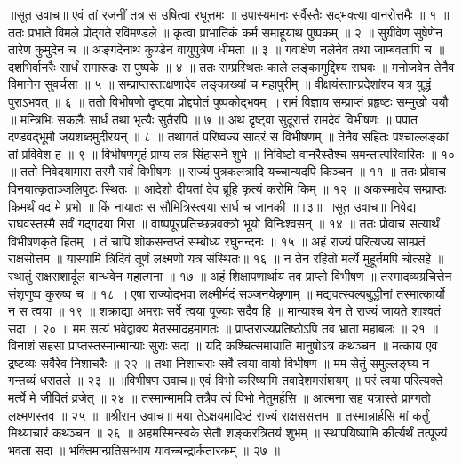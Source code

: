 ॥सूत उवाच॥
एवं तां रजनीं तत्र स उषित्वा रघूत्तमः ॥
उपास्यमानः सर्वैस्तैः सद्भक्त्या वानरोत्तमैः ॥ १ ॥
ततः प्रभाते विमले प्रोद्गते रविमण्डले ॥
कृत्वा प्राभातिकं कर्म समाहूयाथ पुष्पकम् ॥ २ ॥
सुग्रीवेण सुषेणेन तारेण कुमुदेन च ॥
अङ्गदेनाथ कुण्डेन वायुपुत्रेण धीमता ॥ ३ ॥
गवाक्षेण नलेनेव तथा जाम्बवतापि च ॥
दशभिर्वानरैः सार्धं समारूढः स पुष्पके ॥ ४ ॥
ततः सम्प्रस्थितः काले लङ्कामुद्दिश्य राघवः ॥
मनोजवेन तेनैव विमानेन सुवर्चसा ॥ ५ ॥
सम्प्राप्तस्तत्क्षणादेव लङ्काख्यां च महापुरीम् ॥
वीक्षयंस्तान्प्रदेशांश्च यत्र युद्धं पुराऽभवत् ॥ ६ ॥
ततो विभीषणो दृष्ट्वा प्रोद्द्योतं पुष्पकोद्भवम् ॥
रामं विज्ञाय सम्प्राप्तं प्रहृष्टः सम्मुखो ययौ ॥
मन्त्रिभिः सकलैः सार्धं तथा भृत्यैः सुतैरपि ॥ ७ ॥
अथ दृष्ट्वा सुदूरात्तं रामदेवं विभीषणः ॥
पपात दण्डवद्भूमौ जयशब्दमुदीरयन् ॥ ८ ॥
तथागतं परिष्वज्य सादरं स विभीषणम् ॥
तेनैव सहितः पश्चाल्लङ्कां तां प्रविवेश ह ॥ ९ ॥
विभीषणगृहं प्राप्य तत्र सिंहासने शुभे ॥
निविष्टो वानरैस्तैश्च समन्तात्परिवारितः ॥ १० ॥
ततो निवेदयामास तस्मै सर्वं विभीषणः ॥
राज्यं पुत्रकलत्रादि यच्चान्यदपि किञ्चन ॥ ११ ॥
ततः प्रोवाच विनयात्कृताञ्जलिपुटः स्थितः ॥
आदेशो दीयतां देव ब्रूहि कृत्यं करोमि किम् ॥ १२ ॥
अकस्मादेव सम्प्राप्तः किमर्थं वद मे प्रभो ॥
किं नायातः स सौमित्रिस्त्वया सार्ध च जानकी ॥।३॥
॥सूत उवाच॥
निवेद्य राघवस्तस्मै सर्वं गद्गदया गिरा ॥
वाष्पपूरप्रतिच्छन्नवक्त्रो भूयो विनिःश्वसन् ॥ १४ ॥
ततः प्रोवाच सत्यार्थं विभीषणकृते हितम् ॥
तं चापि शोकसन्तप्तं सम्बोध्य रघुनन्दनः ॥ १५ ॥
अहं राज्यं परित्यज्य साम्प्रतं राक्षसोत्तम ॥
यास्यामि त्रिदिवं तूर्णं लक्ष्मणो यत्र संस्थितः॥ १६ ॥
न तेन रहितो मर्त्ये मुहूर्तमपि चोत्सहे ॥
स्थातुं राक्षसशार्दूल बान्धवेन महात्मना ॥ १७ ॥
अहं शिक्षापणार्थाय तव प्राप्तो विभीषण ॥
तस्मादव्यग्रचित्तेन संशृणुष्व कुरुष्व च ॥ १८ ॥
एषा राज्योद्भवा लक्ष्मीर्मदं सञ्जनयेन्नृणाम् ॥
मद्यवत्स्वल्पबुद्धीनां तस्मात्कार्यो न स त्वया ॥ १९ ॥
शक्राद्या अमराः सर्वे त्वया पूज्याः सदैव हि ॥
मान्याश्च येन ते राज्यं जायते शाश्वतं सदा । २० ॥
मम सत्यं भवेद्वाक्य मेतस्मादहमागतः ॥
प्राप्तराज्यप्रतिष्ठोऽपि तव भ्राता महाबलः ॥ २१ ॥
विनाशं सहसा प्राप्तस्तस्मान्मान्याः सुराः सदा ॥
यदि कश्चित्समायाति मानुषोऽत्र कथञ्चन ॥
मत्काय एव द्रष्टव्यः सर्वैरेव निशाचरैः ॥ २२ ॥
तथा निशाचराः सर्वे त्वया वार्या विभीषण ॥
मम सेतुं समुल्लङ्घ्य न गन्तव्यं धरातले ॥ २३ ॥
॥विभीषण उवाच॥
एवं विभो करिष्यामि तवादेशमसंशयम् ॥
परं त्वया परित्यक्ते मर्त्ये मे जीवितं व्रजेत् ॥ २४ ॥
तस्मान्मामपि तत्रैव त्वं विभो नेतुमर्हसि ॥
आत्मना सह यत्रास्ते प्राग्गतो लक्ष्मणस्तव ॥ २५ ॥
॥श्रीराम उवाच॥
मया तेऽक्षयमादिष्टं राज्यं राक्षससत्तम ॥
तस्मान्नार्हसि मां कर्तुं मिथ्याचारं कथञ्चन ॥ २६ ॥
अहमस्मिन्स्वके सेतौ शङ्करत्रितयं शुभम् ॥
स्थापयिष्यामि कीर्त्यर्थं तत्पूज्यं भवता सदा ॥
भक्तिमान्प्रतिसन्धाय यावच्चन्द्रार्कतारकम् ॥ २७ ॥
